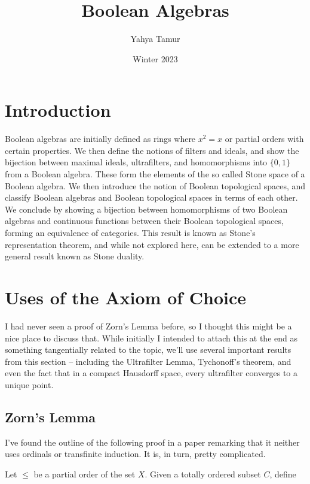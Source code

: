 \documentclass{article}
\title{Boolean Algebras}
\author{Yahya Tamur}
\date{Winter 2023}
\begin{document}
  \maketitle

  \section{Introduction}

    Boolean algebras are initially defined as rings where $x^2 = x$ or partial
    orders with certain properties. We then define the notions of filters and
    ideals, and show the bijection between maximal ideals, ultrafilters, and
    homomorphisms into $\{0,1\}$ from a Boolean algebra. These form the elements
    of the so called Stone space of a Boolean algebra. We then introduce the
    notion of Boolean topological spaces, and classify Boolean algebras and
    Boolean topological spaces in terms of each other. We conclude by showing a
    bijection between homomorphisms of two Boolean algebras and continuous
    functions between their Boolean topological spaces, forming an equivalence
    of categories. This result is known as Stone's representation theorem, and
    while not explored here, can be extended to a more general result known as
    Stone duality.

    \section{Uses of the Axiom of Choice}

      I had never seen a proof of Zorn's Lemma before, so I thought this might
      be a nice place to discuss that. While initially I intended to attach this
      at the end as something tangentially related to the topic, we'll use
      several important results from this section -- including the Ultrafilter
      Lemma, Tychonoff's theorem, and even the fact that  in a compact Hausdorff
      space, every ultrafilter converges to a unique point.

      \subsection{Zorn's Lemma}

        I've found the outline of the following proof in a paper remarking that
        it neither uses ordinals or transfinite induction. It is, in turn,
        pretty complicated.

        Let $\leq$ be a partial order of the set $X$. Given a totally ordered
        subset $C$, define
\end{document}

